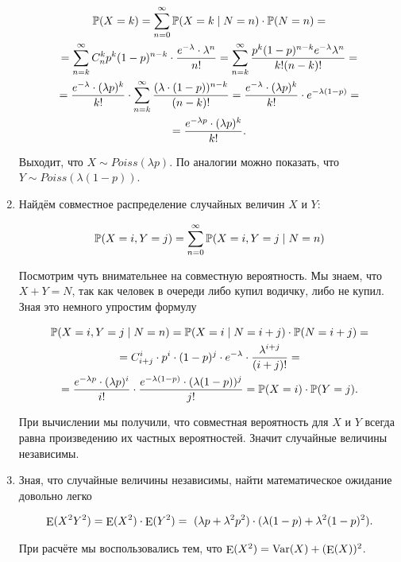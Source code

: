 \begin{problem}
\begin{sol}
\begin{enumerate}
\begin{multline*}
		\mathbb{P}(X = k) = \sum_{n=0}^{\infty} \mathbb{P}(X = k \mid N =n) \cdot \mathbb{P}(N = n) = \\ = \sum_{n = k}^{\infty} C_n^k p^k (1-p)^{n-k} \cdot \frac{e^{-\lambda} \cdot \lambda^n}{n!} = \sum_{n = k}^{\infty} \frac{p^k (1-p)^{n-k} e^{-\lambda} \lambda^n }{k! (n-k)!} = \\ = \frac{e^{-\lambda} \cdot (\lambda p)^k}{k!} \cdot  \sum_{n = k}^{\infty} \frac{(\lambda \cdot (1-p))^{n-k}}{(n-k)!}  = \frac{e^{-\lambda} \cdot (\lambda p)^k}{k!} \cdot e^{-\lambda (1-p)} = \\ = \frac{e^{-\lambda p} \cdot (\lambda p)^k}{k!}.
\end{multline*}

Выходит, что $X \sim Poiss(\lambda p)$. По аналогии можно показать, что $Y \sim Poiss(\lambda (1-p))$.
	
	\item Найдём совместное распределение случайных величин $X$ и $Y$: 
	
\[
	\mathbb{P}(X = i, Y = j) = \sum_{n=0}^{\infty} \mathbb{P}(X = i, Y = j \mid N=n)
\]	

Посмотрим чуть внимательнее на совместную вероятность. Мы знаем, что $X + Y = N$, так как человек в очереди либо купил водичку, либо не купил. Зная это немного упростим формулу

\begin{multline*}
	\mathbb{P}(X = i, Y =j \mid N = n) = \mathbb{P}(X =i \mid N = i + j) \cdot \mathbb{P}(N = i + j)  = \\ = C_{i+j}^{i} \cdot p^i \cdot (1-p)^{j} \cdot e^{-\lambda} \cdot \frac{\lambda^{i + j}}{(i + j)!} =\\= \frac{e^{-\lambda p} \cdot (\lambda p)^i}{i!} \cdot \frac{e^{-\lambda (1-p) } \cdot (\lambda (1-p))^j}{j!} = \mathbb{P}(X = i) \cdot \mathbb{P}(Y = j).
\end{multline*}

При вычислении мы получили, что совместная вероятность для $X$ и $Y$ всегда равна произведению их частных вероятностей. Значит случайные величины независимы. 
	
	\item  Зная, что случайные величины независимы, найти математическое ожидание довольно легко
	
	\begin{multline*}
	\operatorname{\mathop{E}}(X^2 Y^2) = \operatorname{\mathop{E}}(X^2) \cdot \operatorname{\mathop{E}}(Y^2) = \ (\lambda p + \lambda^2 p^2) \cdot (\lambda (1-p) + \lambda^2 (1-p)^2). 
	\end{multline*}
	
	При расчёте мы воспользовались тем, что $\operatorname{\mathop{E}}(X^2) = \operatorname{Var}(X) + (\operatorname{\mathop{E}}(X))^2$. 
	
\end{enumerate}
\end{sol} 
\end{problem}


